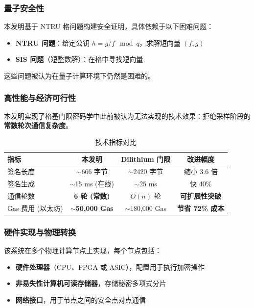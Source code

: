 \subsubsection{量子安全性}

本发明基于 NTRU 格问题构建安全证明，具体依赖于以下困难问题：
\begin{itemize}
    \item \textbf{NTRU 问题}：给定公钥 $h = g/f \mod q$，求解短向量 $(f, g)$
    \item \textbf{SIS 问题}（短整数解）：在格中寻找短向量
\end{itemize}

这些问题被认为在量子计算环境下仍然是困难的。

\subsubsection{高性能与经济可行性}

本发明实现了格基门限密码学中此前被认为无法实现的技术效果：拒绝采样阶段的\textbf{常数轮次通信复杂度}。

\begin{table}[H]
\centering
\caption{技术指标对比}
\begin{tabular}{|l|c|c|c|}
\hline
\textbf{指标} & \textbf{本发明} & \textbf{Dilithium 门限} & \textbf{改进幅度} \\
\hline
签名长度 & $\sim$666 字节 & $\sim$2420 字节 & 缩小 3.6 倍 \\
\hline
签名生成 & $\sim$15 ms (在线) & $\sim$25 ms & 快 40\% \\
\hline
通信轮数 & \textbf{6 轮 (常数)} & $O(n)$ 轮 & \textbf{可扩展性突破} \\
\hline
Gas 费用 (以太坊) & \textbf{$\sim$50,000 Gas} & $\sim$180,000 Gas & \textbf{节省 72\% 成本} \\
\hline
\end{tabular}
\end{table}

\subsubsection{硬件实现与物理转换}

该系统在多个物理计算节点上实现，每个节点包括：
\begin{itemize}
    \item \textbf{硬件处理器}（CPU、FPGA 或 ASIC），配置用于执行加密操作
    \item \textbf{非易失性计算机可读存储器}，存储秘密多项式分片
    \item \textbf{网络接口}，用于节点之间的安全点对点通信
\end{itemize}

